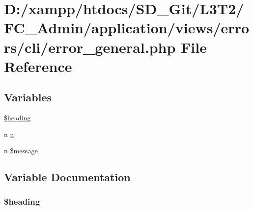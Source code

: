 \hypertarget{_admin_2application_2views_2errors_2cli_2error__general_8php}{}\section{D\+:/xampp/htdocs/\+S\+D\+\_\+\+Git/\+L3\+T2/\+F\+C\+\_\+\+Admin/application/views/errors/cli/error\+\_\+general.php File Reference}
\label{_admin_2application_2views_2errors_2cli_2error__general_8php}
\subsection*{Variables}
\begin{DoxyCompactItemize}
\item 
\hyperlink{_admin_2application_2views_2errors_2cli_2error__general_8php_a196169be7715d466e3310388b096598c}{\$heading}
\item 
n \hyperlink{_admin_2application_2views_2errors_2cli_2error__general_8php_ace0fd03cd383f20ce6ea63247a207294}{n}
\item 
\hyperlink{_admin_2application_2views_2errors_2cli_2error__general_8php_ace0fd03cd383f20ce6ea63247a207294}{n} \hyperlink{_admin_2application_2views_2errors_2cli_2error__general_8php_aaba2b6aee423b3b5e46000f90b4c8c7f}{\$message}
\end{DoxyCompactItemize}


\subsection{Variable Documentation}
\hypertarget{_admin_2application_2views_2errors_2cli_2error__general_8php_a196169be7715d466e3310388b096598c}{}
\subsubsection[{\$heading}]{\setlength{\rightskip}{0pt plus 5cm}\$heading}\label{_admin_2application_2views_2errors_2cli_2error__general_8php_a196169be7715d466e3310388b096598c}
\hypertarget{_admin_2application_2views_2errors_2cli_2error__general_8php_aaba2b6aee423b3b5e46000f90b4c8c7f}{}
